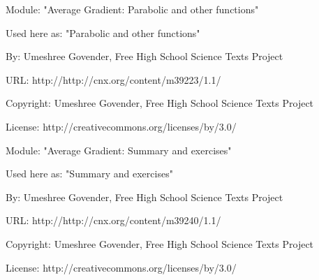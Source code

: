       \par\vspace{9pt}\noindent\begin{minipage}{\textwidth}
      Module: "Average Gradient: Parabolic and other functions" \par\nopagebreak\noindent
      Used here as: "Parabolic and other functions" \par\nopagebreak\noindent
        By: Umeshree Govender, Free High School Science Texts Project\par\nopagebreak\noindent
      URL: http://http://cnx.org/content/m39223/1.1/\par\nopagebreak\noindent
      \par\nopagebreak\noindent
      Copyright: Umeshree Govender, Free High School Science Texts Project\par\nopagebreak\noindent
      License:  http://creativecommons.org/licenses/by/3.0/\par\nopagebreak\noindent
      \par\end{minipage}
      \par\vspace{9pt}\noindent\begin{minipage}{\textwidth}
      Module: "Average Gradient: Summary and exercises" \par\nopagebreak\noindent
      Used here as: "Summary and exercises" \par\nopagebreak\noindent
        By: Umeshree Govender, Free High School Science Texts Project\par\nopagebreak\noindent
      URL: http://http://cnx.org/content/m39240/1.1/\par\nopagebreak\noindent
      \par\nopagebreak\noindent
      Copyright: Umeshree Govender, Free High School Science Texts Project\par\nopagebreak\noindent
      License:  http://creativecommons.org/licenses/by/3.0/\par\nopagebreak\noindent
      \par\end{minipage}

